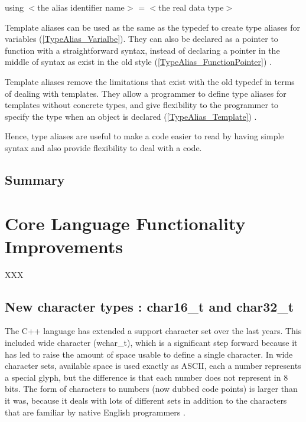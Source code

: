 \documentclass[11pt]{report}
\begin{document}
\begin{center}
using $<$the alias identifier name$>$ = $<$the real data type$>$
\end{center}

Template aliases can be used as the same as the typedef to create type aliases for variables (\ref{TypeAlias_Varialbe}). They can also be declared as a pointer to function with a straightforward syntax, instead of declaring a pointer in the middle of syntax as exist in the old style (\ref{TypeAlias_FunctionPointer}) \cite{Gregorie:professionalcpp}.


Template aliases remove the limitations that exist with the old typedef in terms of dealing with templates. They allow a programmer to define type aliases for templates without concrete types, and give flexibility to the programmer to specify the type when an object is declared (\ref{TypeAlias_Template}) \cite{Gregorie:professionalcpp}.


Hence, type aliases are useful to make a code easier to read by having simple syntax and also provide flexibility to deal with a code.

\section{Summary}
\label{sect: Summary}


\chapter{Core Language Functionality Improvements}
\label{chapter: Functionality Improvements}

XXX

\section{New character types : char16\_t and char32\_t}
\label{section: char16_t and char32_t}
The C++ language has extended a support character set over the last years. This included wide character (wchar\_t), which is a significant step forward because it has led to raise the amount of space usable to define a single character. In wide character sets, available space is used exactly as ASCII, each a number represents a special glyph, but the difference is that each number does not represent in 8 bits. The form of characters to numbers (now dubbed code points) is larger than it was, because it deals with lots of different sets in addition to the characters that are familiar by native English programmers \cite{Gregorie:professionalcpp}.
\end{document}
